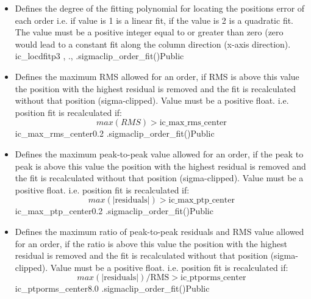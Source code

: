 \begin{itemize}
\item {}
{Defines the degree of the fitting polynomial for locating the positions error of each order i.e. if value is 1 is a linear fit, if the value is 2 is a quadratic fit. The value must be a positive integer equal to or greater than zero (zero would lead to a constant fit along the column direction (x-axis direction).}
{ic\_locdfitp}{3}
{\callocRAW}{\constantsfile}{\spirouKeywords, \callocRAW.\progMAIN, \spirouLOCOR.sigmaclip\_order\_fit()}{Public}


\item {}
{Defines the maximum RMS allowed for an order, if RMS is above this value the position with the highest residual is removed and the fit is recalculated without that position (sigma-clipped). Value must be a positive float.
\vspace{0.5cm}
i.e. position fit is recalculated if: 
\begin{equation}
max(RMS) > \text{ic\_max\_rms\_center}
\end{equation}
}
{ic\_max\_rms\_center}{0.2}
{\callocRAW}{\constantsfile}
{\spirouLOCOR.sigmaclip\_order\_fit()}{Public}


\item {}
{Defines the maximum peak-to-peak value allowed for an order, if the peak to peak is above this value the position with the highest residual is removed and the fit is recalculated without that position (sigma-clipped). Value must be a positive float.
\vspace{0.5cm}
i.e. position fit is recalculated if: 
\begin{equation}
max(|\text{residuals}|) > \text{ic\_max\_ptp\_center}
\end{equation}
}
{ic\_max\_ptp\_center}{0.2}
{\callocRAW}{\constantsfile}{\spirouLOCOR.sigmaclip\_order\_fit()}{Public}


\item {}
{Defines the maximum ratio of peak-to-peak residuals and RMS value allowed for an order, if the ratio is above this value the position with the highest residual is removed and the fit is recalculated without that position (sigma-clipped). Value must be a positive float.
\vspace{0.5cm}
i.e. position fit is recalculated if: 
\begin{equation}
max(|\text{residuals}|)/\text{RMS} > \text{ic\_ptporms\_center}
\end{equation}
}
{ic\_ptporms\_center}{8.0}
{\callocRAW}{\constantsfile}{\spirouLOCOR.sigmaclip\_order\_fit()}{Public}



\end{itemize}

